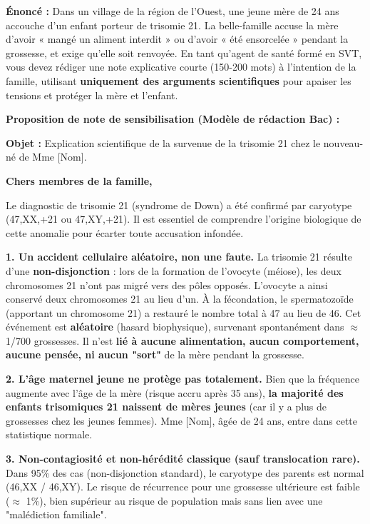 \documentclass[11pt]{article}
\begin{document}
\begin{exoresolu}
    \textbf{Énoncé :} Dans un village de la région de l'Ouest, une jeune mère de 24 ans accouche d'un enfant porteur de trisomie 21. La belle-famille accuse la mère d'avoir « mangé un aliment interdit » ou d'avoir « été ensorcelée » pendant la grossesse, et exige qu'elle soit renvoyée. En tant qu'agent de santé formé en SVT, vous devez rédiger une note explicative courte (150-200 mots) à l'intention de la famille, utilisant \textbf{uniquement des arguments scientifiques} pour apaiser les tensions et protéger la mère et l'enfant.

    \tcblower
    \textbf{Proposition de note de sensibilisation (Modèle de rédaction Bac) :}

    \begin{definition}
    \textbf{Objet :} Explication scientifique de la survenue de la trisomie 21 chez le nouveau-né de Mme [Nom].

    \textbf{Chers membres de la famille,}

    Le diagnostic de trisomie 21 (syndrome de Down) a été confirmé par caryotype (47,XX,+21 ou 47,XY,+21). Il est essentiel de comprendre l'origine biologique de cette anomalie pour écarter toute accusation infondée.

    \textbf{1. Un accident cellulaire aléatoire, non une faute.}
    La trisomie 21 résulte d'une \textbf{non-disjonction} : lors de la formation de l'ovocyte (méiose), les deux chromosomes 21 n'ont pas migré vers des pôles opposés. L'ovocyte a ainsi conservé deux chromosomes 21 au lieu d'un. À la fécondation, le spermatozoïde (apportant un chromosome 21) a restauré le nombre total à 47 au lieu de 46. Cet événement est \textbf{aléatoire} (hasard biophysique), survenant spontanément dans $\approx$ 1/700 grossesses. Il n'est \textbf{lié à aucune alimentation, aucun comportement, aucune pensée, ni aucun "sort"} de la mère pendant la grossesse.

    \textbf{2. L'âge maternel jeune ne protège pas totalement.}
    Bien que la fréquence augmente avec l'âge de la mère (risque accru après 35 ans), \textbf{la majorité des enfants trisomiques 21 naissent de mères jeunes} (car il y a plus de grossesses chez les jeunes femmes). Mme [Nom], âgée de 24 ans, entre dans cette statistique normale.

    \textbf{3. Non-contagiosité et non-hérédité classique (sauf translocation rare).}
    Dans 95\% des cas (non-disjonction standard), le caryotype des parents est normal (46,XX / 46,XY). Le risque de récurrence pour une grossesse ultérieure est faible ($\approx$ 1\%), bien supérieur au risque de population mais sans lien avec une "malédiction familiale".


\end{definition}
\end{exoresolu}
\end{document}
